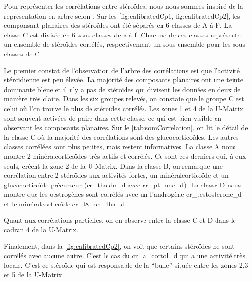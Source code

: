     Pour représenter les corrélations entre stéroïdes, nous nous sommes inspiré de la représentation en arbre selon \cite{Barreto-Sanz:2011}. Sur les \autoref{fig:calibratedCp1, fig:calibratedCp2}, les componsant planaires des stéroïdes ont été séparés en 6 classes de A à F. La classe C est divisée en 6 sous-classes de a à f. Chacune de ces classes représente un ensemble de stéroïdes corrélés, respectivement un sous-ensemble pour les sous-classes de C.
    
    Le premier constat de l'observation de l'arbre des corrélations est que l'activité stéroïdienne est peu élevée. La majorité des composants planaires ont une teinte dominante bleue et il n'y a pas de stéroïdes qui divisent les données en deux de manière très claire. Dans les six groupes relevés, on constate que le groupe C est celui où l'on trouve le plus de stéroïdes corrélés. Les zones 1 et 4 de la U-Matrix sont souvent activées de paire dans cette classe, ce qui est bien visible en observant les composants planaires. Sur le \autoref{tab:somCorrelation}, on lit le détail de la classe C où la majorité des corrélations sont des glucocorticoïdes. Les autres classes corrélées sont plus petites, mais restent informatives. La classe A nous montre 2 minéralcorticoïdes très actifs et corrélés. Ce sont ces derniers qui, à eux seuls, créent la zone 2 de la U-Matrix. Dans la classe B, on remarque une corrélation entre 2 stéroïdes aux activités fortes, un minéralcorticoïde et un glucocorticoïde précurseur (cr\_thaldo\_d avec cr\_pt\_one\_d). La classe D nous montre que les oestrogènes sont corrélés avec un l'androgène cr\_testosterone\_d et le minéralcorticoïde cr\_l8\_oh\_tha\_d.

    Quant aux corrélations partielles, on en observe entre la classe C et D dans le cadran 4 de la U-Matrix.  


    Finalement, dans la \autoref{fig:calibratedCp2}, on voit que certains stéroïdes ne sont corrélés avec aucune autre. C'est le cas du cr\_a\_cortol\_d qui a une activité très locale. C'est ce stéroïde qui est responsable de la ``bulle'' située entre les zones 2,3 et 5 de la U-Matrix. 


